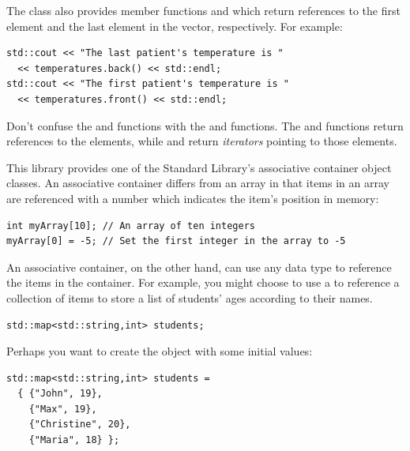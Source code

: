 The  class also provides member functions  and  which return references to the first element and the last element in the vector, respectively.
For example:

\noindent\begin{minipage}{\linewidth}\begin{lstlisting}
std::cout << "The last patient's temperature is " 
  << temperatures.back() << std::endl;
std::cout << "The first patient's temperature is " 
  << temperatures.front() << std::endl;
\end{lstlisting}\end{minipage}

Don't confuse the  and  functions with the  and  functions. 
The  and  functions return references to the elements, while  and  return \emph{iterators} pointing to those elements.


This library provides one of the Standard Library's associative container object classes. 
An associative container differs from an array in that items in an array are referenced with a number which indicates the item's position in memory:

\noindent\begin{minipage}{\linewidth}\begin{lstlisting}
int myArray[10]; // An array of ten integers
myArray[0] = -5; // Set the first integer in the array to -5
\end{lstlisting}\end{minipage}

An associative container, on the other hand, can use any data type to reference the items in the container. 
For example, you might choose to use a  to reference a collection of  items to store a list of students' ages according to their names.

\noindent\begin{minipage}{\linewidth}\begin{lstlisting}
std::map<std::string,int> students;
\end{lstlisting}\end{minipage}

Perhaps you want to create the object with some initial values: \nopagebreak[4]

\noindent\begin{minipage}{\linewidth}\begin{lstlisting}
std::map<std::string,int> students = 
  { {"John", 19}, 
    {"Max", 19}, 
    {"Christine", 20}, 
    {"Maria", 18} };
\end{lstlisting}\end{minipage}

